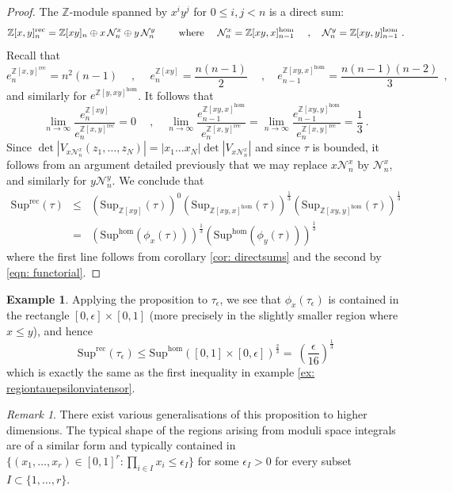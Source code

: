 \documentclass[a4paper,10pt]{amsart}
\theoremstyle{definition}
\newtheorem{example}[thm]{Example}
\theoremstyle{remark}
\newtheorem{rem}[thm]{Remark}
\numberwithin{equation}{section}
\newcommand{\Z}{\mathbb Z}
\newcommand{\rec}{\mathrm{rec}}
\newcommand{\ts}{\mathrm{Sup}}
\newcommand{\0}{\color{blue}{\mathsf{0}}}
\begin{document}
  \begin{proof}
The $\Z$-module spanned by $x^i y^j$ for $0\leq i,j< n$ is a direct sum:
\[ \Z[x,y]^{\rec}_n = \Z[xy]_{n}  \oplus x\, \mathcal{N}_n^x \oplus y\, \mathcal{N}_n^y \qquad \hbox{ where } \quad 
 \mathcal{N}_n^x=    \Z[ xy,x]^{\hom}_{n-1} \quad \   , 
\quad  \mathcal{N}_n^y=  \Z[ xy,y]^{\hom}_{n-1} \ . \] 
 Recall that 
 \[  e^{\Z[x,y]^{\rec}}_n = n^2(n-1) \quad \ ,\quad  \  e^{\Z[xy]}_{n} = \frac{n(n-1)}{2} \quad  \ , \quad  e^{\Z[xy,x]^{\hom}}_{n-1}=  \frac{n(n-1)(n-2)}{3}\ \ , \]
 and similarly for $e^{\Z[y, xy]^{\hom}}$. 
 It follows that 
 \[ \lim_{n\rightarrow \infty}  \frac{e^{\Z[xy]}_{n}   }{   e^{\Z[x,y]^{\rec}}_n} =0   \quad  \ , \quad   \lim_{n\rightarrow \infty} \frac{e^{\Z[ xy,x ]^{\hom}}_{n-1}}{e^{\Z[x,y]^{\rec}}_n }  = \lim_{n\rightarrow \infty} \frac{e^{\Z[ xy,y ]^{\hom}}_{n-1}}{e^{\Z[x,y]^{\rec}}_n }   = \frac{1}{3} \ .  \]
 Since $\det |V_{x\mathcal{N}_n^x}(z_1,\ldots, z_N)| = |x_1\ldots x_N|  \det |V_{x\mathcal{N}_n^x}|$ and since $\tau$ is bounded, it follows from  an argument detailed previously that we may replace $x \mathcal{N}^x_n$  by $\mathcal{N}^x_n$, and similarly for $y \mathcal{N}^y_n$.
  We conclude that 
 \begin{eqnarray} \ts^{ \rec} (\tau)  &\leq&   \left(\ts_{\Z[xy]} (\tau)\right)^0  \left(\ts_{\Z[xy,x]^{\hom}} (\tau)\right)^{\frac{1}{3}}   \left(\ts_{\Z[xy,y]^{\hom}} (\tau)\right)^{\frac{1}{3}}    \nonumber  \\
 & = &   \left(\ts^{\hom} (\phi_x(\tau))\right)^{\frac{1}{3}}   \left(\ts^{\hom} (\phi_y(\tau))\right)^{\frac{1}{3}}      \nonumber 
 \end{eqnarray} 
 where the first line follows from corollary  \ref{cor: directsums} and the second by  \eqref{eqn: functorial}. 
  \end{proof} 
  
  \begin{example}
Applying the proposition to  $\tau_{\epsilon}$, we see that $\phi_x( \tau_{\epsilon})$ is contained in the rectangle $[0,\epsilon] \times [0,1]$ (more precisely in  the slightly smaller  region where $x\leq y$), and hence
  \[    \ts^{\rec}(\tau_{\epsilon})   \leq     \ts^{\hom} ( [0,1] \times [0,\epsilon])^{\frac{2}{3}} =   \ \left(\frac{\epsilon}{16}\right)^{\frac{1}{3}}\]
  which is exactly the same  as the first inequality in example \ref{ex: regiontauepsilonviatensor}.
    \end{example}
      
    \begin{rem}
    There  exist various generalisations of this proposition to higher dimensions. The typical shape of the regions arising from moduli space integrals \cite{DinnerParties} are
    of a similar form and typically contained in $\{(x_1,\ldots, x_r) \in [0,1]^r:  \prod_{i\in I} x_i \leq \epsilon_I\}$ for some  $\epsilon_I>0$  for every subset $I\subset \{1,\ldots, r\}$. 
    
  
  
  \end{rem} 
  
\end{document}
